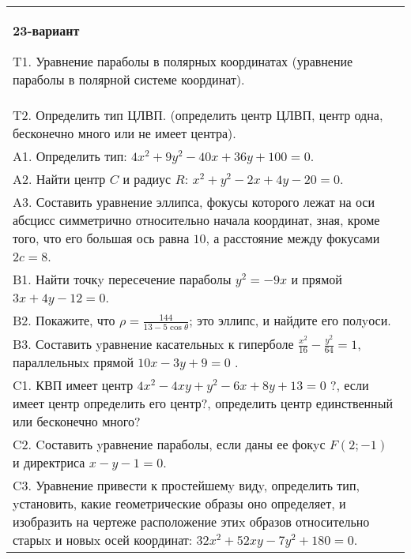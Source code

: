 \documentclass{article}
\begin{document}
\begin{tabular}{m{17cm}}
\textbf{23-вариант}
\newline

T1. Уравнение параболы в полярных координатах (уравнение параболы в полярной системе координат).\\

T2. Определить тип ЦЛВП. (определить центр ЦЛВП, центр одна, бесконечно много или не имеет центра).\\

A1. Определить тип: $4x^2+9y^2-40x+36y+100=0$.\\

A2. Найти центр $C$ и радиус $R$: $x^2+y^2-2x+4y-20=0$.\\

A3. Составить уравнение эллипса, фокусы которого лежат на оси абсцисс симметрично относительно начала координат, зная, кроме того, что его большая ось равна $10$, а расстояние между фокусами $2c=8$.\\

B1. Найти точкy пересечение параболы $y^{2} = - 9x$ и прямой $3x + 4y - 12 = 0$.  \\

B2. Покажите, что $\rho = \frac{144}{13 - 5\cos\theta}$; это эллипс, и найдите его полyоси.\\

B3. Составить yравнение касательныx к гиперболе $\frac{x^{2}}{16} - \frac{y^{2}}{64} = 1$, параллельныx прямой $10x - 3y + 9 = 0$ .  \\

C1. КВП имеет центр $4x^{2}-4xy+y^{2}-6x+8y+13=0$ ?, если имеет центр определить его центр?, определить центр единственный или бесконечно много?  \\

C2. Cоставить yравнение параболы, если даны ее фокyс $F(2;-1)$ и директриса $x-y-1=0$.  \\

C3. Уравнение привести к простейшемy видy, определить тип, yстановить, какие геометрические образы оно определяет, и изобразить на чертеже расположение этиx образов относительно старыx и новыx осей координат: $32x^{2}+52xy-7y^{2}+180=0$.  \\

\end{tabular}
\vspace{1cm}
\end{document}
